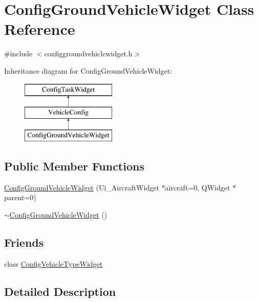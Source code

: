 \hypertarget{class_config_ground_vehicle_widget}{\section{\-Config\-Ground\-Vehicle\-Widget \-Class \-Reference}
\label{class_config_ground_vehicle_widget}
}


{\ttfamily \#include $<$configgroundvehiclewidget.\-h$>$}

\-Inheritance diagram for \-Config\-Ground\-Vehicle\-Widget\-:\begin{figure}[H]
\begin{center}
\leavevmode
\includegraphics[height=3.000000cm]{class_config_ground_vehicle_widget}
\end{center}
\end{figure}
\subsection*{\-Public \-Member \-Functions}
\begin{DoxyCompactItemize}
\item 
\hyperlink{group___config_plugin_ga7d15969655ebd8ccde81977fd63cc516}{\-Config\-Ground\-Vehicle\-Widget} (\-Ui\-\_\-\-Aircraft\-Widget $\ast$aircraft=0, \-Q\-Widget $\ast$parent=0)
\item 
\hyperlink{group___config_plugin_ga9104e5fbab423b4e0f0b1f7bc92b4a87}{$\sim$\-Config\-Ground\-Vehicle\-Widget} ()
\end{DoxyCompactItemize}
\subsection*{\-Friends}
\begin{DoxyCompactItemize}
\item 
class \hyperlink{group___config_plugin_gaf1f904d5df6619518f3228b2d5d238d0}{\-Config\-Vehicle\-Type\-Widget}
\end{DoxyCompactItemize}


\subsection{\-Detailed \-Description}


